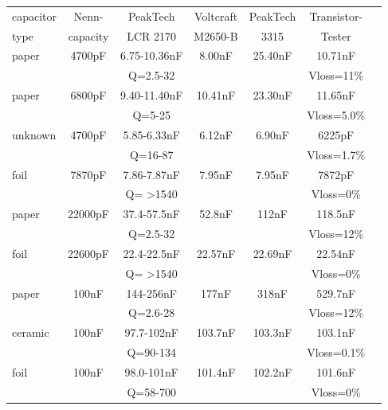 \begin{tabular}{| l | c | c | c | c | c | c |}
   \hline
capacitor & Nenn-      & PeakTech      & Voltcraft & PeakTech & Transistor- \\
type        & capacity  & LCR 2170     & M2650-B   &  3315    & Tester      \\
    \hline
    \hline
paper     & 4700pF      & 6.75-10.36nF & 8.00nF    &  25.40nF & 10.71nF  \\
          &             & Q=2.5-32     &           &          & Vloss=11\% \\
    \hline
paper     & 6800pF      & 9.40-11.40nF & 10.41nF   &  23.30nF & 11.65nF \\
          &             & Q=5-25       &           &          & Vloss=5.0\% \\
    \hline
unknown  & 4700pF      & 5.85-6.33nF & 6.12nF    &  6.90nF  & 6225pF \\
           &             & Q=16-87     &           &          & Vloss=1.7\% \\
    \hline
foil      & 7870pF      & 7.86-7.87nF  & 7.95nF    &  7.95nF  & 7872pF \\
          &             & Q= >1540     &           &          & Vloss=0\% \\
    \hline
paper     & 22000pF     & 37.4-57.5nF  & 52.8nF    &  112nF   & 118.5nF \\
          &             & Q=2.5-32     &           &          & Vloss=12\% \\
    \hline
foil      & 22600pF     & 22.4-22.5nF  & 22.57nF   & 22.69nF  & 22.54nF \\
          &             & Q= >1540     &           &          & Vloss=0\% \\
    \hline
paper     & 100nF       & 144-256nF    & 177nF     &  318nF   & 529.7nF \\
          &             & Q=2.6-28     &           &          & Vloss=12\% \\
    \hline
ceramic   & 100nF       & 97.7-102nF   & 103.7nF   & 103.3nF  & 103.1nF \\
          &             & Q=90-134     &           &          & Vloss=0.1\% \\
    \hline
foil      & 100nF       & 98.0-101nF   & 101.4nF   & 102.2nF  & 101.6nF \\
          &             & Q=58-700     &           &          & Vloss=0\% \\
    \hline
\end{tabular}
\vspace{0.5 cm}


